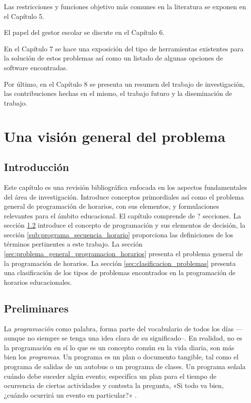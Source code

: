 \documentclass[draft,12pt,headsepline,footsepline,paper=letter]{scrreprt}
\begin{document}
Las restricciones y funciones objetivo más comunes en la literatura se exponen en el Capítulo 5.

El papel del gestor escolar se discute en el Capítulo 6.

En el Capítulo 7 se hace una exposición del tipo de herramientas existentes para la solución de estos problemas así como un listado de algunas opciones de software encontradas.

Por último, en el Capítulo 8 se presenta un resumen del trabajo de investigación, las contribuciones hechas en el mismo, el trabajo futuro y la diseminación de trabajo.

\chapter{Una visión general del problema}

\section{Introducción}

Este capítulo es una revisión bibliográfica enfocada en los aspectos fundamentales del área de investigación.
Introduce conceptos primordiales así como el problema general de programación de horarios, con sus elementos, y formulaciones relevantes para el ámbito educacional.
El capítulo comprende de ? secciones. La sección \ref{sec:preliminares} introduce el concepto de programación y sus elementos de decisión, la sección \ref{sub:programa_secuencia_horario} proporciona las definiciones de los términos pertinentes a este trabajo. La sección \ref{sec:problema_general_programacion_horarios} presenta el problema general de la programación de horarios. La sección \ref{sec:clasificacion_problemas} presenta una clasificación de los tipos de problemas encontrados en la programación de horarios educacionales.

\section{Preliminares}
\label{sec:preliminares}

La \textit{programación} como palabra, forma parte del vocabulario de todos los días —aunque no siempre se tenga una idea clara de su significado–. En realidad, no es la programación en sí lo que es un concepto común en la vida diaria, son más bien los \textit{programas}. Un programa es un plan o documento tangible, tal como el programa de salidas de un autobus o un programa de clases. Un programa señala cuándo debe suceder algún evento; especifíca un plan para el tiempo de ocurrencia de ciertas actividades y contesta la pregunta, «Si todo va bien, ¿cuándo ocurrirá un evento en particular?» \cite[p.~1]{Baker2009}.
\end{document}
